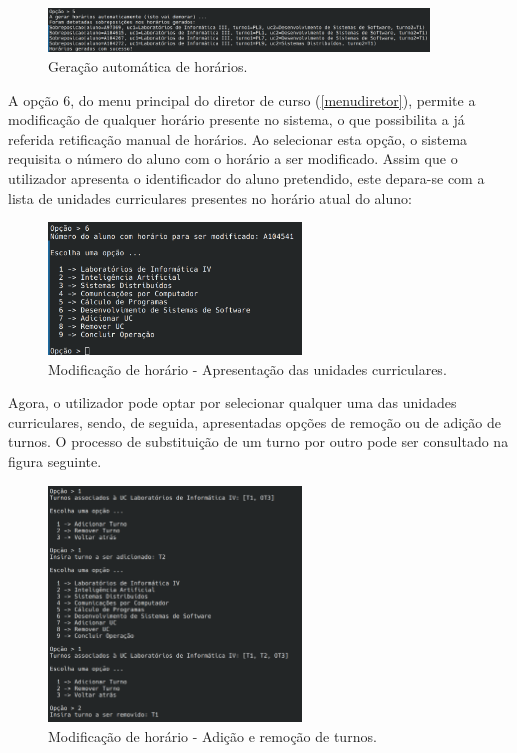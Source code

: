 \documentclass[12pt, a4paper]{article}
\begin{document}
\begin{figure}[H]
    \centering
    \includegraphics[width=0.9\textwidth]{Imagens/Manual/DiretorCurso-5.png}
    \caption{Geração automática de horários.}
\end{figure}

A opção 6, do menu principal do diretor de curso (\ref{menudiretor}), permite a modificação de
qualquer horário presente no sistema, o que possibilita a já referida retificação manual de
horários. Ao selecionar esta opção, o sistema requisita o número do aluno com o horário a ser
modificado. Assim que o utilizador apresenta o identificador do aluno pretendido, este depara-se com
a lista de unidades curriculares presentes no horário atual do aluno:

\begin{figure}[H]
    \centering
    \includegraphics[width=0.6\textwidth]{Imagens/Manual/DiretorCurso-6.png}
    \caption{Modificação de horário - Apresentação das unidades curriculares.}
\end{figure}

Agora, o utilizador pode optar por selecionar qualquer uma das unidades curriculares, sendo, de
seguida, apresentadas opções de remoção ou de adição de turnos. O processo de substituição de um
turno por outro pode ser consultado na figura seguinte.

\begin{figure}[H]
    \centering
    \includegraphics[width=0.6\textwidth]{Imagens/Manual/DiretorCurso-6-1.png}
    \caption{Modificação de horário - Adição e remoção de turnos.}
\end{figure}
\end{document}
